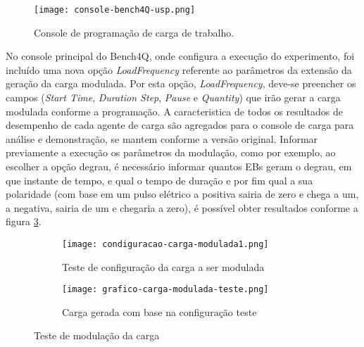 \begin{figure}[!htb]
	\centering
	\texttt{[image: console-bench4Q-usp.png]}
	\caption{Console de programação de carga de trabalho.}
	\label{fig:interface-criada-beanch4q}
	\fautor
\end{figure}

No console principal do Bench4Q, onde configura a execução do experimento, foi incluído uma nova opção \textit{LoadFrequency} referente ao parâmetros da extensão da geração da carga modulada. Por esta opção, \textit{LoadFrequency}, deve-se preencher os campos (\textit{Start Time}, \textit{Duration Step}, \textit{Pause} e \textit{Quantity}) que irão gerar a carga modulada conforme a programação. A caracteristica de todos os resultados de desempenho de cada agente de carga são agregados para o console de carga para análise e demonstração, se mantem conforme a versão original.
Informar previamente a execução os parâmetros da modulação, como por exemplo, ao escolher a opção degrau, é necessário informar quantos EBs geram o degrau, em que instante de tempo, e qual o tempo de duração e por fim qual a sua polaridade (com base em um pulso elétrico a positiva sairia de zero e chega a um, a negativa, sairia de um e chegaria a zero), é possível obter resultados conforme a figura \ref{fig:grafico-carga-modulada-teste}.

\begin{figure}[!htb]
	\centering
	\begin{subfigure}{\linewidth}
		\centering
		\texttt{[image: condiguracao-carga-modulada1.png]}
		\caption{Teste de configuração da carga a ser modulada}
		\label{fig:configuracao-carga-modulada-teste}
	\end{subfigure}
	
	\begin{subfigure}{\linewidth}
		\centering
		\texttt{[image: grafico-carga-modulada-teste.png]}
		\caption{Carga gerada com base na configuração teste}
		\label{fig:grafico-carga-modulada-teste}
	\end{subfigure}  
	\caption{Teste de modulação da carga}  
	\label{fig:carga-modulada-teste}
	\fautor
\end{figure}  

